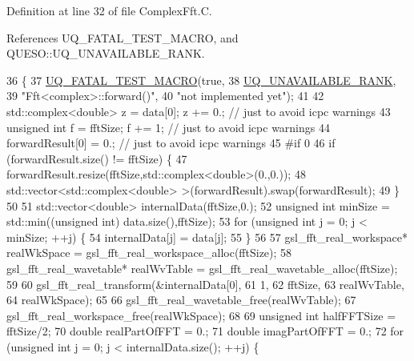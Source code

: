 Definition at line 32 of file Complex\-Fft.\-C.



References U\-Q\-\_\-\-F\-A\-T\-A\-L\-\_\-\-T\-E\-S\-T\-\_\-\-M\-A\-C\-R\-O, and Q\-U\-E\-S\-O\-::\-U\-Q\-\_\-\-U\-N\-A\-V\-A\-I\-L\-A\-B\-L\-E\-\_\-\-R\-A\-N\-K.


\begin{DoxyCode}
36 \{
37   \hyperlink{_defines_8h_a56d63d18d0a6d45757de47fcc06f574d}{UQ\_FATAL\_TEST\_MACRO}(\textcolor{keyword}{true},
38                       \hyperlink{namespace_q_u_e_s_o_a7d4679800a430ae8e473c1c7bc0bfb21}{UQ\_UNAVAILABLE\_RANK},
39                       \textcolor{stringliteral}{"Fft<complex>::forward()"},
40                       \textcolor{stringliteral}{"not implemented yet"});
41 
42   std::complex<double> z = data[0]; z += 0.; \textcolor{comment}{// just to avoid icpc warnings}
43   \textcolor{keywordtype}{unsigned} \textcolor{keywordtype}{int}         f = fftSize; f += 1;  \textcolor{comment}{// just to avoid icpc warnings}
44   forwardResult[0] = 0.;                     \textcolor{comment}{// just to avoid icpc warnings}
45 \textcolor{preprocessor}{#if 0}
46 \textcolor{preprocessor}{}  \textcolor{keywordflow}{if} (forwardResult.size() != fftSize) \{
47     forwardResult.resize(fftSize,std::complex<double>(0.,0.));
48     std::vector<std::complex<double> >(forwardResult).swap(forwardResult);
49   \}
50 
51   std::vector<double> internalData(fftSize,0.);
52   \textcolor{keywordtype}{unsigned} \textcolor{keywordtype}{int} minSize = std::min((\textcolor{keywordtype}{unsigned} \textcolor{keywordtype}{int}) data.size(),fftSize);
53   \textcolor{keywordflow}{for} (\textcolor{keywordtype}{unsigned} \textcolor{keywordtype}{int} j = 0; j < minSize; ++j) \{
54     internalData[j] = data[j];
55   \}
56 
57   gsl\_fft\_real\_workspace* realWkSpace = gsl\_fft\_real\_workspace\_alloc(fftSize);
58   gsl\_fft\_real\_wavetable* realWvTable = gsl\_fft\_real\_wavetable\_alloc(fftSize);
59 
60   gsl\_fft\_real\_transform(&internalData[0],
61                          1,
62                          fftSize,
63                          realWvTable,
64                          realWkSpace);
65 
66   gsl\_fft\_real\_wavetable\_free(realWvTable);
67   gsl\_fft\_real\_workspace\_free(realWkSpace);
68 
69   \textcolor{keywordtype}{unsigned} \textcolor{keywordtype}{int} halfFFTSize = fftSize/2;
70   \textcolor{keywordtype}{double} realPartOfFFT = 0.;
71   \textcolor{keywordtype}{double} imagPartOfFFT = 0.;
72   \textcolor{keywordflow}{for} (\textcolor{keywordtype}{unsigned} \textcolor{keywordtype}{int} j = 0; j < internalData.size(); ++j) \{

\end{DoxyCode}
